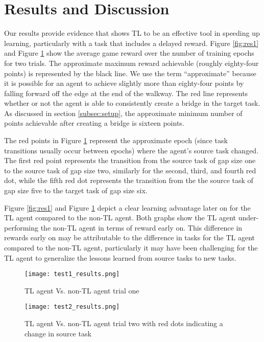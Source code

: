 \documentclass{llncs}
\begin{document}
\section{Results and Discussion}\label{sec:results}

Our results provide evidence that shows TL to be an effective tool in speeding up learning, particularly with a task that includes a delayed reward.
Figure \ref{fig:res1} and Figure \ref{fig:res2} show the average game reward over the number of training epochs for two trials. 
The approximate maximum reward achievable (roughly eighty-four points) is represented by the black line.
We use the term ``approximate'' because it is possible for an agent to achieve slightly more than eighty-four points by falling forward off the edge at the end of the walkway.
The red line represents whether or not the agent is able to consistently create a bridge in the target task. 
As discussed in section \ref{subsec:setup}, the approximate minimum number of points achievable after creating a bridge is sixteen points.

The red points in Figure \ref{fig:res2} represent the approximate epoch (since task transitions usually occur between epochs) where the agent's source task changed.  
The first red point represents the transition from the source task of gap size one to the source task of gap size two, similarly for the second, third, and fourth red dot, while the fifth red dot represents the transition from the the source task of gap size five to the target task of gap size six.

Figure \ref{fig:res1} and Figure \ref{fig:res2} depict a clear learning advantage later on for the TL agent compared to the non-TL agent. 
Both graphs show the TL agent under-performing the non-TL agent in terms of reward early on.
This difference in rewards early on may be attributable to the difference in tasks for the TL agent compared to the non-TL agent, particularly it may have been challenging for the TL agent to generalize the lessons learned from source tasks to new tasks.


\begin{figure}[H]
  \begin{center}
    \texttt{[image: test1\_results.png]}
  \end{center}
  \caption{TL agent Vs. non-TL agent trial one}
  \label{fig:res1}

  \begin{center}
    \texttt{[image: test2\_results.png]}
  \end{center}
  \caption{TL agent Vs. non-TL agent trial two with red dots indicating a change in source task}
  \label{fig:res2}
\end{figure} 
\end{document}
